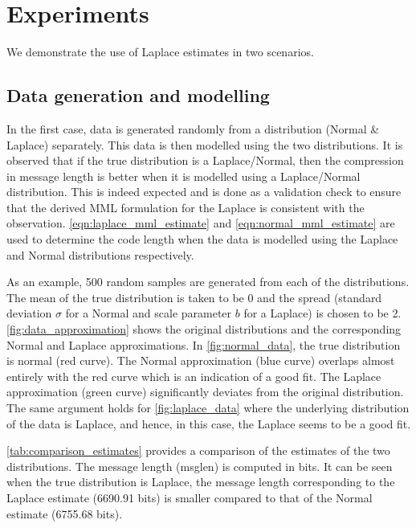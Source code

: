 \documentclass[wcp]{jmlr}
\begin{document}
\section{Experiments}
We demonstrate the use of Laplace estimates in two scenarios. 

\subsection{Data generation and modelling}
In the first case, data is generated randomly from a distribution (Normal \& Laplace) 
separately. This data is then modelled using the two distributions.
It is observed that if the true distribution is a Laplace/Normal, then the
compression in message length is better when it is modelled using a Laplace/Normal
distribution. This is indeed expected and is done as a validation check to ensure that 
the derived MML formulation for the Laplace is consistent with the observation.
\eqref{eqn:laplace_mml_estimate} and \eqref{eqn:normal_mml_estimate} are used to determine
the code length when the data is modelled using the Laplace and Normal distributions
respectively. 

As an example, 500 random samples are generated from each of the distributions.
The mean of the true distribution is taken to be 0 and the spread (standard
deviation $\sigma$ for a Normal and scale parameter $b$ for a Laplace) is
chosen to be 2. \autoref{fig:data_approximation} shows the original distributions
and the corresponding Normal and Laplace approximations. In \autoref{fig:normal_data},
the true distribution is normal (red curve). The Normal approximation (blue curve)
overlaps almost entirely with the red curve which is an indication of a good fit.
The Laplace approximation (green curve) significantly deviates from the original
distribution. The same argument holds for \autoref{fig:laplace_data} where the
underlying distribution of the data is Laplace, and hence, in this case, the Laplace
seems to be a good fit. 

\autoref{tab:comparison_estimates} provides a comparison of the estimates of the
two distributions. The message length (msglen) is computed in bits. It can be seen
when the true distribution is Laplace, the message length corresponding to the Laplace 
estimate (6690.91 bits) is smaller compared to that of the Normal estimate (6755.68 bits).
\end{document}
